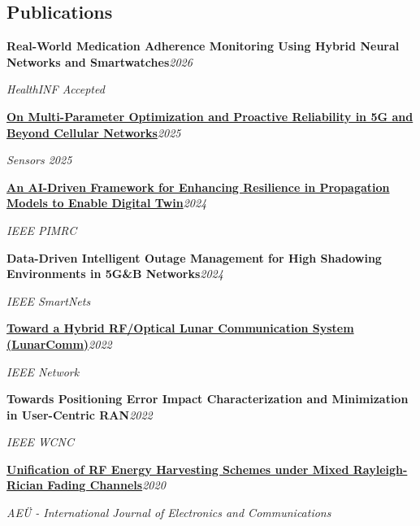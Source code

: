 \documentclass[9pt,letterpaper]{extarticle}
\newcommand{\entry}[2]{\Needspace{4\baselineskip}\textbf{#1}\hfill\textit{#2}\par}
\begin{document}
\subsection{Publications}
\entry{Real-World Medication Adherence Monitoring Using Hybrid Neural Networks and Smartwatches}{2026}
\textit{HealthINF \textbar{} Accepted}\par
\entry{\href{https://doi.org/10.3390/s25247651}{On Multi-Parameter Optimization and Proactive Reliability in 5G and Beyond Cellular Networks}}{2025}
\textit{Sensors 2025}\par
\entry{\href{https://doi.org/10.1109/PIMRC59610.2024.10817403}{An AI-Driven Framework for Enhancing Resilience in Propagation Models to Enable Digital Twin}}{2024}
\textit{IEEE PIMRC}\par
\entry{Data-Driven Intelligent Outage Management for High Shadowing Environments in 5G\&B Networks}{2024}
\textit{IEEE SmartNets}\par
\entry{\href{https://arxiv.org/abs/2203.15899}{Toward a Hybrid RF/Optical Lunar Communication System (LunarComm)}}{2022}
\textit{IEEE Network}\par
\entry{Towards Positioning Error Impact Characterization and Minimization in User-Centric RAN}{2022}
\textit{IEEE WCNC}\par
\entry{\href{https://doi.org/10.1016/j.aeue.2020.153244}{Unification of RF Energy Harvesting Schemes under Mixed Rayleigh-Rician Fading Channels}}{2020}
\textit{AEÜ - International Journal of Electronics and Communications}\par
{}
\end{document}
